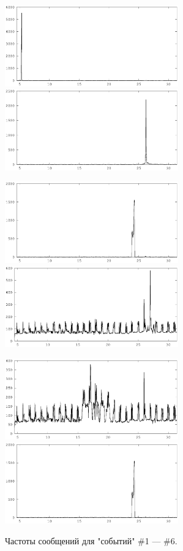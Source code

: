 \documentclass[12pt, a4paper]{article}
\begin{document}
	\begin{figure}[H]
	\centering

	\includegraphics[width=7.5cm]{all-freq-5-8.eps}	
	\includegraphics[width=7.5cm]{all-freq-26-5.eps}	
	
	\includegraphics[width=7.5cm]{all-freq-24-6.eps}	
	\includegraphics[width=7.5cm]{all-freq-27-0.eps}	
	
	\includegraphics[width=7.5cm]{all-freq-17-2.eps}	
	\includegraphics[width=7.5cm]{all-freq-23-20.eps}	
	
	\caption{Частоты сообщений для "событий" \#1 --- \#6.}
	\end{figure}
	
\end{document}
